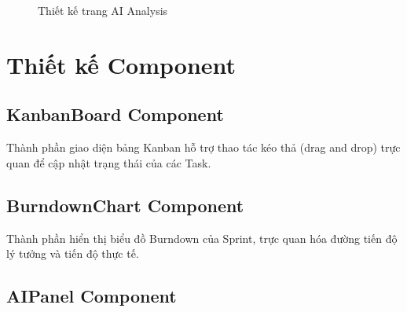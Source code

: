 \documentclass[12pt,a4paper]{report}
\begin{document}
\begin{figure}[H]
\centering
{}
\caption{Thiết kế trang AI Analysis}
\label{fig:ai_analysis_page}
\end{figure}

\section{Thiết kế Component}

\subsection{KanbanBoard Component}

Thành phần giao diện bảng Kanban hỗ trợ thao tác kéo thả (drag and drop) trực quan để cập nhật trạng thái của các Task.

\subsection{BurndownChart Component}

Thành phần hiển thị biểu đồ Burndown của Sprint, trực quan hóa đường tiến độ lý tưởng và tiến độ thực tế.

\subsection{AIPanel Component}
\end{document}
